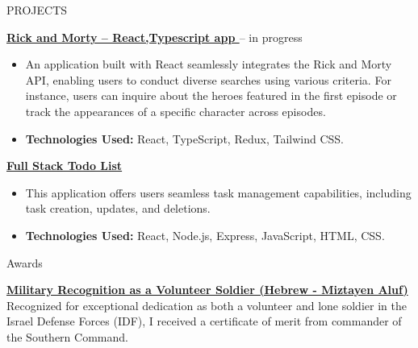 \documentclass{resume}
\begin{document}

 \begin{rSection}{PROJECTS}

  \textbf{\href{https://github.com/Asnvir/React-TS-RickMorty}{Rick and Morty – React,Typescript app }}– in progress

  \begin{itemize}
   \item An application built with React seamlessly integrates the Rick and Morty API, enabling users to conduct diverse searches using various criteria. For instance, users can inquire about the heroes featured in the first episode or track the appearances of a specific character across episodes.
   \item \textbf{Technologies Used:} React, TypeScript, Redux, Tailwind CSS.

  \end{itemize}

  \vspace{0.25em} %

  \textbf{{\href{https://github.com/Asnvir/todo-react-app}{Full Stack Todo List }}}

  \begin{itemize}
   \item This application offers users seamless task management capabilities, including task creation, updates, and deletions.
   \item \textbf{Technologies Used:} React, Node.js, Express, JavaScript, HTML, CSS.
  \end{itemize}


 \end{rSection}

 \begin{rSection}{Awards}
  \vspace{-1.25em}
  \item \textbf{\href{https://drive.google.com/file/d/1QWiVud-gSK4n_YLskh-mxVn0zGRxDvHW/view?usp=sharing}{Military Recognition as a Volunteer Soldier (Hebrew - Miztayen Aluf)}}
  \\Recognized for exceptional dedication as both a volunteer and lone soldier in the Israel Defense Forces (IDF), I received a certificate of merit from commander of the Southern Command.
 \end{rSection}
\end{document}
